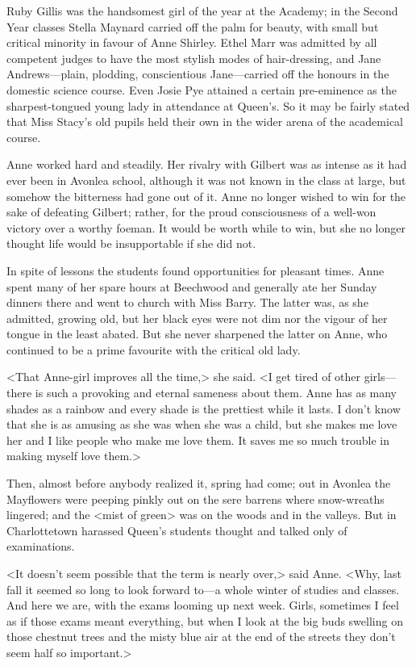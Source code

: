 Ruby Gillis was the handsomest girl of the year at the Academy; in the Second Year classes Stella Maynard carried off the palm for beauty, with small but critical minority in favour of Anne Shirley. Ethel Marr was admitted by all competent judges to have the most stylish modes of hair-dressing, and Jane Andrews—plain, plodding, conscientious Jane—carried off the honours in the domestic science course. Even Josie Pye attained a certain pre-eminence as the sharpest-tongued young lady in attendance at Queen's. So it may be fairly stated that Miss Stacy's old pupils held their own in the wider arena of the academical course.

Anne worked hard and steadily. Her rivalry with Gilbert was as intense as it had ever been in Avonlea school, although it was not known in the class at large, but somehow the bitterness had gone out of it. Anne no longer wished to win for the sake of defeating Gilbert; rather, for the proud consciousness of a well-won victory over a worthy foeman. It would be worth while to win, but she no longer thought life would be insupportable if she did not.

In spite of lessons the students found opportunities for pleasant times. Anne spent many of her spare hours at Beechwood and generally ate her Sunday dinners there and went to church with Miss Barry. The latter was, as she admitted, growing old, but her black eyes were not dim nor the vigour of her tongue in the least abated. But she never sharpened the latter on Anne, who continued to be a prime favourite with the critical old lady.

<That Anne-girl improves all the time,> she said. <I get tired of other girls—there is such a provoking and eternal sameness about them. Anne has as many shades as a rainbow and every shade is the prettiest while it lasts. I don't know that she is as amusing as she was when she was a child, but she makes me love her and I like people who make me love them. It saves me so much trouble in making myself love them.>

Then, almost before anybody realized it, spring had come; out in Avonlea the Mayflowers were peeping pinkly out on the sere barrens where snow-wreaths lingered; and the <mist of green> was on the woods and in the valleys. But in Charlottetown harassed Queen's students thought and talked only of examinations.

<It doesn't seem possible that the term is nearly over,> said Anne. <Why, last fall it seemed so long to look forward to—a whole winter of studies and classes. And here we are, with the exams looming up next week. Girls, sometimes I feel as if those exams meant everything, but when I look at the big buds swelling on those chestnut trees and the misty blue air at the end of the streets they don't seem half so important.>

